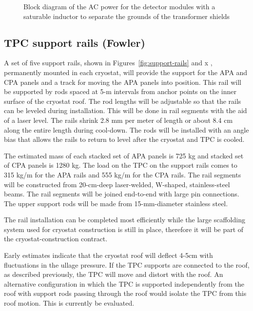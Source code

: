 \begin{figure}[htpb]
\centering
\caption[AC power for the detector modules with a saturable inductor]{Block diagram of the AC power for the detector modules with a saturable inductor to separate the grounds of the transformer shields}
\label{fig:acpwr-det-modules}
\end{figure}

\subsection{TPC support rails (Fowler)}
\label{fd:install:integ:rails}

A set of five support rails, shown in Figures~\ref{fig:support-rails} and x , permanently mounted in each cryostat, will provide the support for the APA and CPA panels and a track for moving the APA panels into position.  
This rail will be supported by rods spaced at 5-m intervals from anchor points on the inner surface of the cryostat roof.  The rod lengths will be adjustable so that the rails can be leveled during installation.  This will be done in rail segments with the aid of a laser level.  The rails shrink 
2.8 mm per meter of length or about 8.4 cm along the entire length during cool-down.  The rods will be installed with an angle bias that allows the rails to return to level after the cryostat and TPC is cooled.

The estimated mass of each stacked set of APA panels is 725 kg and stacked set of CPA panels is 1280 kg.  The load on the TPC on the support rails comes to 315 kg/m for the APA rails and 555 kg/m 
for the CPA rails.  The rail segments will be constructed from 20-cm-deep laser-welded, W-shaped, stainless-steel beams.  The rail segments will be joined end-to-end with large pin connections.  The 
upper support rods will be made from 15-mm-diameter stainless steel.

The rail installation can be completed most efficiently while the large scaffolding system used for cryostat construction is still in place, therefore it will be part of the cryostat-construction contract.

Early estimates indicate that the cryostat roof will deflect 4-5cm with fluctuations in the ullage pressure.  If the TPC supports are connected to the roof, as described previously, the TPC will move and distort with 
the roof.  An alternative configuration in which the TPC is supported independently from the roof with support rods passing through the roof would isolate the TPC from this roof motion. This is currently be evaluated.

